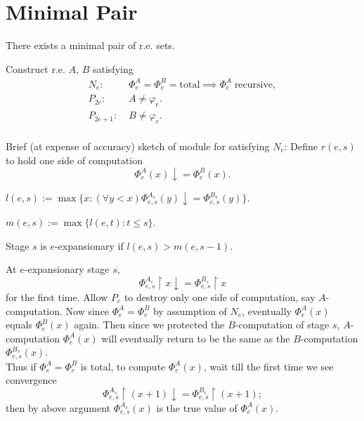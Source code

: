 \section{Minimal Pair}
  \begin{theorem}
    There exists a minimal pair of r.e. sets.
  \end{theorem}

  Construct r.e. $A$, $B$ satisfying
  \begin{align*}
    N_e: &\;\Phi_e^A=\Phi_e^B=\text{total} \implies \Phi_e^A\;
      \text{recursive},\\
    P_{2e}: &\;A\neq \varphi_e.\\
    P_{2e+1}: &\;B\neq \varphi_e.\\
  \end{align*}

  Brief (at expense of accuracy) sketch of module for satisfying $N_e$:
  Define $r(e,s)$ to hold one side of computation
  \[\Phi_e^A(x) \downarrow=\Phi_e^B(x).\]

  \begin{definition}
    $l(e,s) :=\max\{x: (\forall y<x) \Phi_{e,s}^{A_s}(y)
    \downarrow=\Phi_{e,s}^{B_s}(y)\}$.
  \end{definition}

  \begin{definition}
    $m(e,s) := \max\{l(e,t): t\leq s\}$.
  \end{definition}

  \begin{definition}
    Stage $s$ is $e$-expansionary if $l(e,s) > m(e,s-1)$.
  \end{definition}

  At $e$-expansionary stage $s$,
  \[\Phi_{e,s}^{A_s} \restriction x \downarrow= \Phi_{e,s}^{B_s}
  \restriction x\]
  for the first time. Allow $P_e$ to destroy only one side of computation,
  say $A$-computation. Now since $\Phi_e^A=\Phi_e^B$ by assumption of
  $N_e$, eventually $\Phi_e^A(x)$ equals $\Phi_e^B(x)$ again. Then since we
  protected the $B$-computation of stage $s$, $A$-computation
  $\Phi_e^A(x)$ will eventually return to be the same as the
  $B$-computation $\Phi_{e,s}^{B_s}(x)$. \\

  Thus if $\Phi_e^A=\Phi_e^B$ is total, to compute $\Phi_e^A(x)$, wait till
  the first time we see convergence 
  \[\Phi_{e,s}^{A_s} \restriction (x+1) \downarrow= \Phi_{e,s}^{B_s}
  \restriction (x+1);\]
  then by above argument $\Phi_{e,s}^{A_s}(x)$ is the true value of
  $\Phi_e^A(x)$. \\

